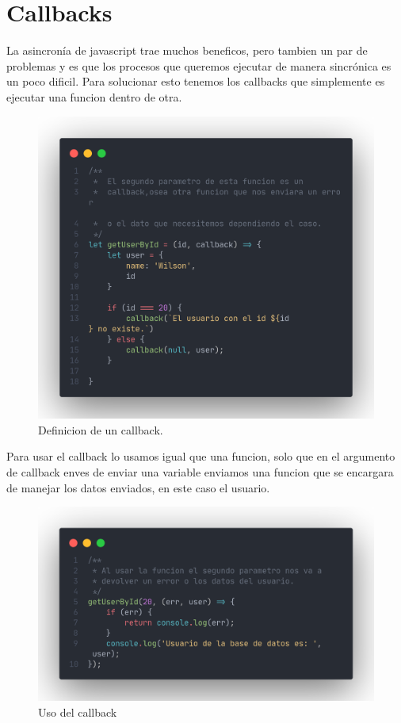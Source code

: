 \documentclass[12pt]{article}
\begin{document}
\section{Callbacks}

La asincronía de javascript trae muchos beneficos, pero tambien un par de problemas y es que los procesos que queremos ejecutar de manera sincrónica es un poco dificil. Para solucionar esto tenemos los callbacks que simplemente es ejecutar una funcion dentro de otra.

\begin{figure}[H]
	\centering
	\includegraphics[scale=0.3]{assets/images/callbacks-1.png}
	\caption{Definicion de un callback.}
\end{figure}

Para usar el callback lo usamos igual que una funcion, solo que en el argumento de callback enves de enviar una variable enviamos una funcion que se encargara de manejar los datos enviados, en este caso el usuario.

\begin{figure}[H]
	\centering
	\includegraphics[scale=0.2]{assets/images/callbacks-2.png}
	\caption{Uso del callback}
\end{figure}
\end{document}
